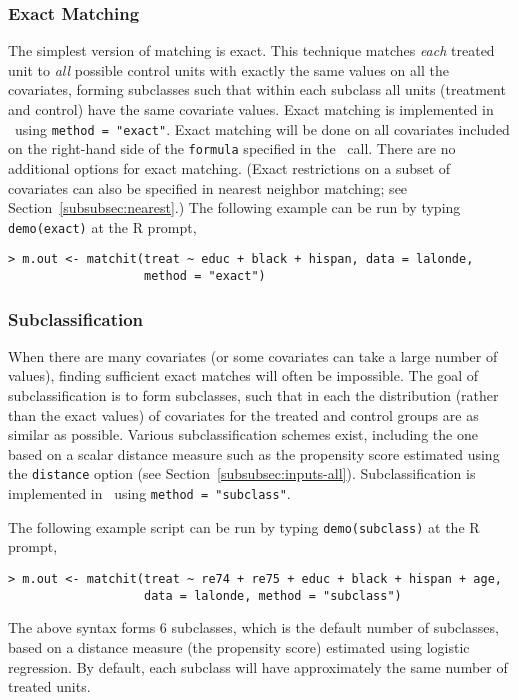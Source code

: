 \subsubsection{Exact Matching}
\label{subsubsec:exact}

The simplest version of matching is exact.  This technique matches
\emph{each} treated unit to \emph{all} possible control units with
exactly the same values on all the covariates, forming subclasses such
that within each subclass all units (treatment and control) have the
same covariate values.  Exact matching is implemented in \MatchIt\ 
using \texttt{method = "exact"}.  Exact matching will be done on all
covariates included on the right-hand side of the \texttt{formula}
specified in the \MatchIt\ call.  There are no additional options for
exact matching.  (Exact restrictions on a subset of covariates can
also be specified in nearest neighbor matching; see
Section~\ref{subsubsec:nearest}.)  The following example can be
run by typing {\tt demo(exact)} at the R prompt,
\begin{verbatim}
> m.out <- matchit(treat ~ educ + black + hispan, data = lalonde, 
                   method = "exact")
\end{verbatim}

\subsubsection{Subclassification}
\label{subsubsec:subclass}

When there are many covariates (or some covariates can take a large
number of values), finding sufficient exact matches will often be
impossible.  The goal of subclassification is to form subclasses, such
that in each the distribution (rather than the exact values) of
covariates for the treated and control groups are as similar as
possible.  Various subclassification schemes exist, including the one
based on a scalar distance measure such as the propensity score
estimated using the \texttt{distance} option (see
Section~\ref{subsubsec:inputs-all}).  Subclassification is implemented
in \MatchIt\ using \texttt{method = "subclass"}.

The following example script can be run by typing {\tt demo(subclass)}
at the R prompt,
\begin{verbatim}
> m.out <- matchit(treat ~ re74 + re75 + educ + black + hispan + age, 
                   data = lalonde, method = "subclass")
\end{verbatim}
The above syntax forms 6 subclasses, which is the default number
of subclasses, based on a distance measure (the propensity score) estimated using logistic
regression.  By default, each subclass will have approximately the
same number of treated units.

